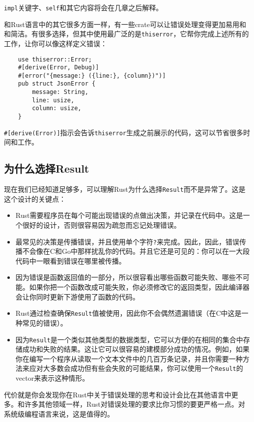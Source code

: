 \texttt{impl}关键字、\texttt{self}和其它内容将会在几章之后解释。

和Rust语言中的其它很多方面一样，有一些crate可以让错误处理变得更加易用和和简洁。有很多选择，但其中使用最广泛的是\texttt{thiserror}，它帮你完成上述所有的工作，让你可以像这样定义错误：
\begin{verbatim}
    use thiserror::Error;
    #[derive(Error, Debug)]
    #[error("{message:} ({line:}, {column})")]
    pub struct JsonError {
        message: String,
        line: usize,
        column: usize,
    }
\end{verbatim}

\texttt{\#[derive(Error)]}指示会告诉\texttt{thiserror}生成之前展示的代码，这可以节省很多时间和工作。

\subsection{为什么选择Result}
现在我们已经知道足够多，可以理解Rust为什么选择\texttt{Result}而不是异常了。这是这个设计的关键点：
\begin{itemize}
    \item Rust需要程序员在每个可能出现错误的点做出决策，并记录在代码中。这是一个很好的设计，否则很容易因为疏忽而忘记处理错误。
    \item 最常见的决策是传播错误，并且使用单个字符\texttt{?}来完成。因此，因此，错误传播不会像在C和Go中那样扰乱你的代码。并且它还是可见的：你可以在一大段代码中一眼看到错误在哪里被传播。
    \item 因为错误是函数返回值的一部分，所以很容看出哪些函数可能失败、哪些不可能。如果你把一个函数改成可能失败，你必须修改它的返回类型，因此编译器会让你同时更新下游使用了函数的代码。
    \item Rust通过检查确保\texttt{Result}值被使用，因此你不会偶然遗漏错误（在C中这是一种常见的错误）。
    \item 因为\texttt{Result}是一个类似其他类型的数据类型，它可以方便的在相同的集合中存储成功和失败的结果。这让它可以很容易的建模部分成功的情况。例如，如果你在编写一个程序从读取一个文本文件中的几百万条记录，并且你需要一种方法来应对大多数会成功但有些会失败的可能结果，你可以使用一个\texttt{Result}的vector来表示这种情形。
\end{itemize}

代价就是你会发现你在Rust中关于错误处理的思考和设计会比在其他语言中更多。和许多其他领域一样，Rust对错误处理的要求比你习惯的要更严格一点。对系统级编程语言来说，这是值得的。

